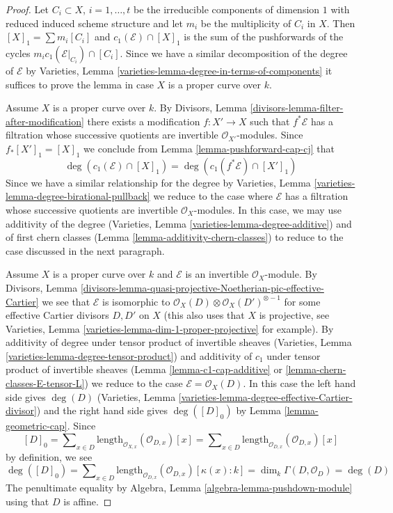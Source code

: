 \begin{proof}
Let $C_i \subset X$, $i = 1, \ldots, t$ be the irreducible components
of dimension $1$ with reduced induced scheme structure and let $m_i$ be the
multiplicity of $C_i$ in $X$. Then $[X]_1 = \sum m_i[C_i]$ and
$c_1(\mathcal{E}) \cap [X]_1$ is the sum of the pushforwards of the cycles
$m_i c_1(\mathcal{E}|_{C_i}) \cap [C_i]$. Since we have a similar decomposition
of the degree of $\mathcal{E}$ by
Varieties, Lemma \ref{varieties-lemma-degree-in-terms-of-components}
it suffices to prove the lemma in case $X$ is a proper curve over $k$.

\medskip\noindent
Assume $X$ is a proper curve over $k$.
By Divisors, Lemma \ref{divisors-lemma-filter-after-modification}
there exists a modification $f : X' \to X$ such that $f^*\mathcal{E}$
has a filtration whose successive quotients are invertible
$\mathcal{O}_{X'}$-modules. Since $f_*[X']_1 = [X]_1$ we conclude
from Lemma \ref{lemma-pushforward-cap-cj} that
$$
\deg(c_1(\mathcal{E}) \cap [X]_1) = \deg(c_1(f^*\mathcal{E}) \cap [X']_1)
$$
Since we have a similar relationship for the degree by
Varieties, Lemma \ref{varieties-lemma-degree-birational-pullback}
we reduce to the case where $\mathcal{E}$ has a filtration whose
successive quotients are invertible $\mathcal{O}_X$-modules.
In this case, we may use additivity of the degree
(Varieties, Lemma \ref{varieties-lemma-degree-additive})
and of first chern classes (Lemma \ref{lemma-additivity-chern-classes})
to reduce to the case discussed in the next paragraph.

\medskip\noindent
Assume $X$ is a proper curve over $k$ and $\mathcal{E}$ is an
invertible $\mathcal{O}_X$-module. By
Divisors, Lemma
\ref{divisors-lemma-quasi-projective-Noetherian-pic-effective-Cartier}
we see that $\mathcal{E}$ is isomorphic to
$\mathcal{O}_X(D) \otimes \mathcal{O}_X(D')^{\otimes -1}$
for some effective Cartier divisors $D, D'$ on $X$ (this also uses
that $X$ is projective, see
Varieties, Lemma \ref{varieties-lemma-dim-1-proper-projective} for example).
By additivity of degree under tensor product of invertible sheaves
(Varieties, Lemma \ref{varieties-lemma-degree-tensor-product})
and additivity of $c_1$ under tensor product of invertible sheaves
(Lemma \ref{lemma-c1-cap-additive} or \ref{lemma-chern-classes-E-tensor-L})
we reduce to the case $\mathcal{E} = \mathcal{O}_X(D)$.
In this case the left hand side gives $\deg(D)$
(Varieties, Lemma \ref{varieties-lemma-degree-effective-Cartier-divisor})
and the right hand side gives $\deg([D]_0)$ by
Lemma \ref{lemma-geometric-cap}.
Since
$$
[D]_0 = \sum\nolimits_{x \in D}
\text{length}_{\mathcal{O}_{X, x}}(\mathcal{O}_{D, x}) [x] =
\sum\nolimits_{x \in D}
\text{length}_{\mathcal{O}_{D, x}}(\mathcal{O}_{D, x}) [x]
$$
by definition, we see
$$
\deg([D]_0) = \sum\nolimits_{x \in D}
\text{length}_{\mathcal{O}_{D, x}}(\mathcal{O}_{D, x}) [\kappa(x) : k] =
\dim_k \Gamma(D, \mathcal{O}_D) = \deg(D)
$$
The penultimate equality by
Algebra, Lemma \ref{algebra-lemma-pushdown-module}
using that $D$ is affine.
\end{proof}

